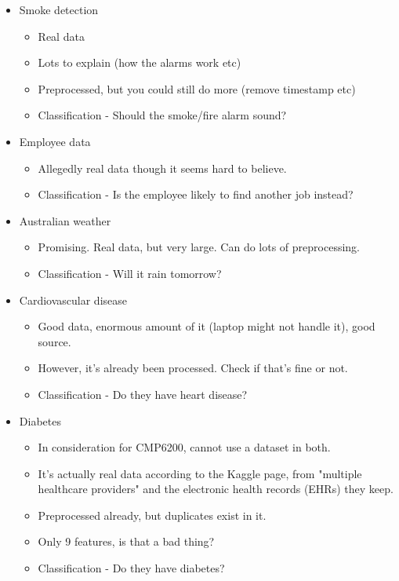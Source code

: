 \documentclass[12pt]{report}
\begin{document}
\begin{itemize}
    \item Smoke detection \begin{itemize}
        \item Real data
        \item Lots to explain (how the alarms work etc)
        \item Preprocessed, but you could still do more (remove timestamp etc)
        \item Classification - Should the smoke/fire alarm sound?
    \end{itemize}
    \item Employee data \begin{itemize}
        \item Allegedly real data though it seems hard to believe.
        \item Classification - Is the employee likely to find another job instead?
    \end{itemize}
    \item Australian weather \begin{itemize}
        \item Promising. Real data, but very large. Can do lots of preprocessing.
        \item Classification - Will it rain tomorrow?
    \end{itemize}
    \item Cardiovascular disease \begin{itemize}
        \item Good data, enormous amount of it (laptop might not handle it), good source. 
        \item However, it's already been processed. Check if that's fine or not.
        \item Classification - Do they have heart disease?
    \end{itemize}
    \item Diabetes \begin{itemize}
        \item In consideration for CMP6200, cannot use a dataset in both.
        \item It's actually real data according to the Kaggle page, from "multiple healthcare providers" and the 
        electronic health records (EHRs) they keep.
        \item Preprocessed already, but duplicates exist in it.
        \item Only 9 features, is that a bad thing?
        \item Classification - Do they have diabetes?
    \end{itemize}
\end{itemize}
\end{document}
